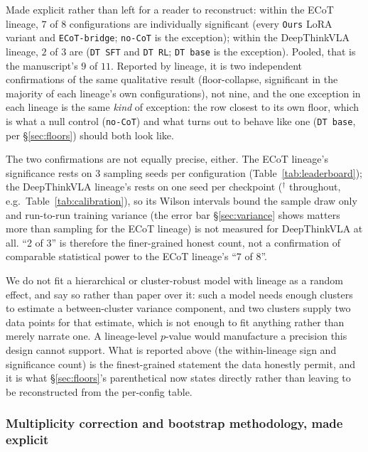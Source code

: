 Made explicit rather than left for a reader to reconstruct: within the ECoT lineage, $7$ of $8$ configurations are individually significant (every \texttt{Ours} LoRA variant and \texttt{ECoT-bridge}; \texttt{no-CoT} is the exception); within the DeepThinkVLA lineage, $2$ of $3$ are (\texttt{DT SFT} and \texttt{DT RL}; \texttt{DT base} is the exception). Pooled, that is the manuscript's $9$ of $11$. Reported by lineage, it is two independent confirmations of the same qualitative result (floor-collapse, significant in the majority of each lineage's own configurations), not nine, and the one exception in each lineage is the same \emph{kind} of exception: the row closest to its own floor, which is what a null control (\texttt{no-CoT}) and what turns out to behave like one (\texttt{DT base}, per \S\ref{sec:floors}) should both look like.

The two confirmations are not equally precise, either. The ECoT lineage's significance rests on 3 sampling seeds per configuration (Table~\ref{tab:leaderboard}); the DeepThinkVLA lineage's rests on one seed per checkpoint ($^\dagger$ throughout, e.g.\ Table~\ref{tab:calibration}), so its Wilson intervals bound the sample draw only and run-to-run training variance (the error bar \S\ref{sec:variance} shows matters more than sampling for the ECoT lineage) is not measured for DeepThinkVLA at all. ``2 of 3'' is therefore the finer-grained honest count, not a confirmation of comparable statistical power to the ECoT lineage's ``7 of 8''.

We do not fit a hierarchical or cluster-robust model with lineage as a random effect, and say so rather than paper over it: such a model needs enough clusters to estimate a between-cluster variance component, and two clusters supply two data points for that estimate, which is not enough to fit anything rather than merely narrate one. A lineage-level $p$-value would manufacture a precision this design cannot support. What is reported above (the within-lineage sign and significance count) is the finest-grained statement the data honestly permit, and it is what \S\ref{sec:floors}'s parenthetical now states directly rather than leaving to be reconstructed from the per-config table.

\subsubsection{Multiplicity correction and bootstrap methodology, made explicit}
\label{sec:multiplicity}


